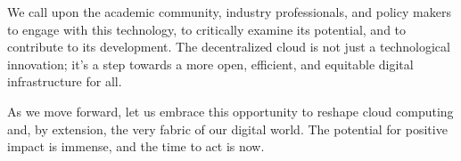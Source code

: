 We call upon the academic community, industry professionals, and policy makers to engage with this technology, to critically examine its potential, and to contribute to its development. The decentralized cloud is not just a technological innovation; it's a step towards a more open, efficient, and equitable digital infrastructure for all.

As we move forward, let us embrace this opportunity to reshape cloud computing and, by extension, the very fabric of our digital world. The potential for positive impact is immense, and the time to act is now.
